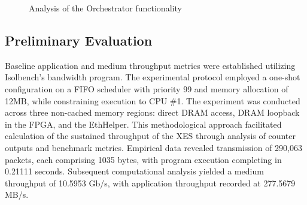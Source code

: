 \begin{figure}
    \centering
    
    \caption{Analysis of the Orchestrator functionality}
    \label{fig:Orchestrator_Verification}
\end{figure}

\subsection{Preliminary Evaluation}


Baseline application and medium throughput metrics were established utilizing Isolbench's bandwidth program. The experimental protocol employed a one-shot configuration on a FIFO scheduler with priority 99 and memory allocation of 12MB, while constraining execution to CPU \#1. The experiment was conducted across three non-cached memory regions: direct DRAM access, DRAM loopback in the FPGA, and the EthHelper. This methodological approach facilitated calculation of the sustained throughput of the XES through analysis of counter outputs and benchmark metrics. Empirical data revealed transmission of 290,063 packets, each comprising 1035 bytes, with program execution completing in 0.21111 seconds. Subsequent computational analysis yielded a medium throughput of 10.5953 Gb/s, with application throughput recorded at 277.5679 MB/s.



